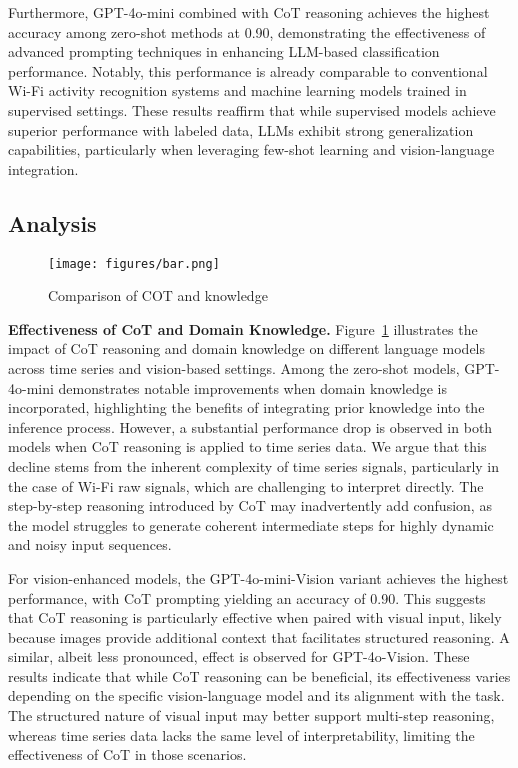 Furthermore, GPT-4o-mini combined with CoT reasoning achieves the highest accuracy among zero-shot methods at 0.90, demonstrating the effectiveness of advanced prompting techniques in enhancing LLM-based classification performance. Notably, this performance is already comparable to conventional Wi-Fi activity recognition systems and machine learning models trained in supervised settings. These results reaffirm that while supervised models achieve superior performance with labeled data, LLMs exhibit strong generalization capabilities, particularly when leveraging few-shot learning and vision-language integration.



\subsection{Analysis}

\begin{figure}[tb]
    \centering
    \texttt{[image: figures/bar.png]}
    \caption{Comparison of COT and knowledge}
    \label{bar}
\end{figure}


\textbf{Effectiveness of CoT and Domain Knowledge.}
Figure~\ref{bar} illustrates the impact of CoT reasoning and domain knowledge on different language models across time series and vision-based settings. Among the zero-shot models, GPT-4o-mini demonstrates notable improvements when domain knowledge is incorporated, highlighting the benefits of integrating prior knowledge into the inference process. However, a substantial performance drop is observed in both models when CoT reasoning is applied to time series data. We argue that this decline stems from the inherent complexity of time series signals, particularly in the case of Wi-Fi raw signals, which are challenging to interpret directly. The step-by-step reasoning introduced by CoT may inadvertently add confusion, as the model struggles to generate coherent intermediate steps for highly dynamic and noisy input sequences.  

For vision-enhanced models, the GPT-4o-mini-Vision variant achieves the highest performance, with CoT prompting yielding an accuracy of 0.90. This suggests that CoT reasoning is particularly effective when paired with visual input, likely because images provide additional context that facilitates structured reasoning. A similar, albeit less pronounced, effect is observed for GPT-4o-Vision. These results indicate that while CoT reasoning can be beneficial, its effectiveness varies depending on the specific vision-language model and its alignment with the task. The structured nature of visual input may better support multi-step reasoning, whereas time series data lacks the same level of interpretability, limiting the effectiveness of CoT in those scenarios.  

